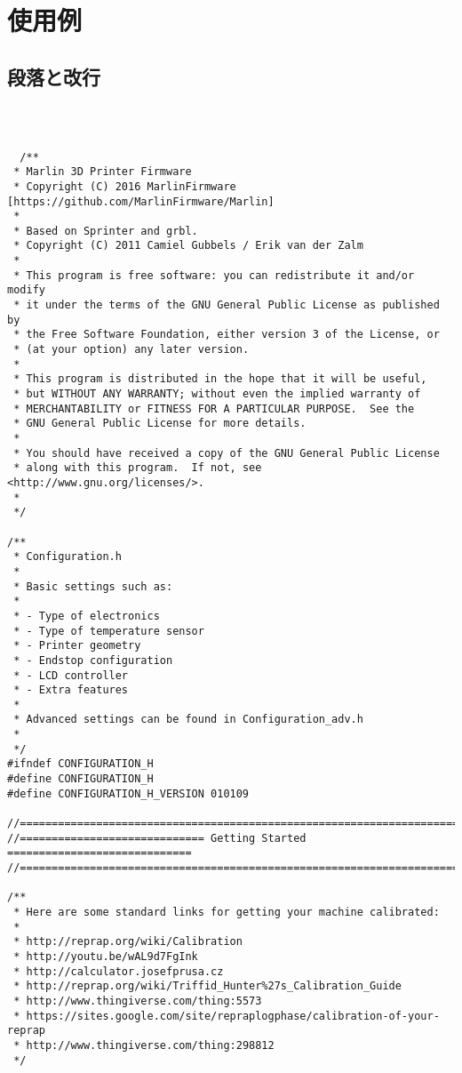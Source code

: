 \chapter{使用例}
\label{chp:first}

\section{段落と改行}
\label{sec:paragraph}

\begin{lstlisting}[caption = キャプション, label = ラベル]



  /**
 * Marlin 3D Printer Firmware
 * Copyright (C) 2016 MarlinFirmware [https://github.com/MarlinFirmware/Marlin]
 *
 * Based on Sprinter and grbl.
 * Copyright (C) 2011 Camiel Gubbels / Erik van der Zalm
 *
 * This program is free software: you can redistribute it and/or modify
 * it under the terms of the GNU General Public License as published by
 * the Free Software Foundation, either version 3 of the License, or
 * (at your option) any later version.
 *
 * This program is distributed in the hope that it will be useful,
 * but WITHOUT ANY WARRANTY; without even the implied warranty of
 * MERCHANTABILITY or FITNESS FOR A PARTICULAR PURPOSE.  See the
 * GNU General Public License for more details.
 *
 * You should have received a copy of the GNU General Public License
 * along with this program.  If not, see <http://www.gnu.org/licenses/>.
 *
 */

/**
 * Configuration.h
 *
 * Basic settings such as:
 *
 * - Type of electronics
 * - Type of temperature sensor
 * - Printer geometry
 * - Endstop configuration
 * - LCD controller
 * - Extra features
 *
 * Advanced settings can be found in Configuration_adv.h
 *
 */
#ifndef CONFIGURATION_H
#define CONFIGURATION_H
#define CONFIGURATION_H_VERSION 010109

//===========================================================================
//============================= Getting Started =============================
//===========================================================================

/**
 * Here are some standard links for getting your machine calibrated:
 *
 * http://reprap.org/wiki/Calibration
 * http://youtu.be/wAL9d7FgInk
 * http://calculator.josefprusa.cz
 * http://reprap.org/wiki/Triffid_Hunter%27s_Calibration_Guide
 * http://www.thingiverse.com/thing:5573
 * https://sites.google.com/site/repraplogphase/calibration-of-your-reprap
 * http://www.thingiverse.com/thing:298812
 */


\end{lstlisting}
